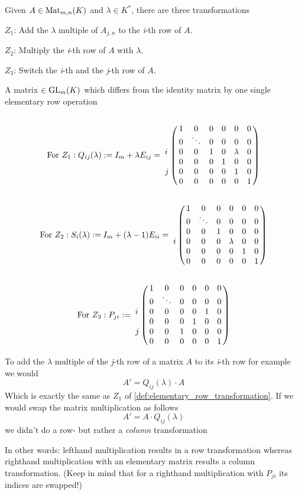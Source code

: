 \begin{definition}\label{def:elementary_row_transformation}
   Given \(A \in \operatorname{Mat}_{m, n}(K)\) and \(\lambda \in K^*\), there are three transformations

   \(Z_1\): Add the \(\lambda\) multiple of \(A_{j,n}\) to the \textit{i}-th row of \(A\).

   \(Z_2\): Multiply the \textit{i}-th row of \(A\) with \(\lambda\).

   \(Z_3\): Switch the \textit{i}-th and the \textit{j}-th row of \(A\).
\end{definition}

\begin{definition}\label{def:elementary_matrix}
   A matrix \(\in \operatorname{GL}_m(K)\) which differs from the identity matrix by one single elementary row operation
   \[\text{For }Z_1: Q_{ij}(\lambda) := I_m + \lambda E_{ij} = \bordermatrix{
      ~ &   &   &   &   &   &   \cr
        & 1 & 0 & 0 & 0 & 0 & 0 \cr
        & 0 & \ddots & 0 & 0 & 0 & 0 \cr
      i & 0 & 0 & 1 & 0 & \lambda & 0 \cr
        & 0 & 0 & 0 & 1 & 0 & 0 \cr
      j & 0 & 0 & 0 & 0 & 1 & 0 \cr
        & 0 & 0 & 0 & 0 & 0 & 1
   }\]
   \[\text{For }Z_2: S_i(\lambda) := I_m + (\lambda - 1) E_{ii} = \bordermatrix{
      ~ &   &   &   &   &   &   \cr
        & 1 & 0 & 0 & 0 & 0 & 0 \cr
        & 0 & \ddots & 0 & 0 & 0 & 0 \cr
        & 0 & 0 & 1 & 0 & 0 & 0 \cr
      i & 0 & 0 & 0 & \lambda & 0 & 0 \cr
        & 0 & 0 & 0 & 0 & 1 & 0 \cr
        & 0 & 0 & 0 & 0 & 0 & 1
   }\]
   \[\text{For }Z_3: P_{ji} := \bordermatrix{
      ~ &   &   &   &   &   &   \cr
        & 1 & 0 & 0 & 0 & 0 & 0 \cr
        & 0 & \ddots & 0 & 0 & 0 & 0 \cr
      i & 0 & 0 & 0 & 0 & 1 & 0 \cr
        & 0 & 0 & 0 & 1 & 0 & 0 \cr
      j & 0 & 0 & 1 & 0 & 0 & 0 \cr
        & 0 & 0 & 0 & 0 & 0 & 1
   }\]
\end{definition}
\begin{remark}
   To add the \(\lambda\) multiple of the \textit{j}-th row of a matrix \(A\) to its \textit{i}-th row for example we would
   \[A' = Q_{ij}(\lambda) \cdot A\]
   Which is exactly the same as \(Z_1\) of \cref{def:elementary_row_transformation}.
   If we would swap the matrix multiplication as follows
   \[A' = A \cdot Q_{ij}(\lambda)\]
   we didn't do a row- but rather a \textit{column} transformation

   In other words: lefthand multiplication results in a row transformation whereas righthand multiplication with an elementary matrix results a column transformation. (Keep in mind that for a righthand multiplication with \(P_{ji}\) its indices are swapped!)
\end{remark}
